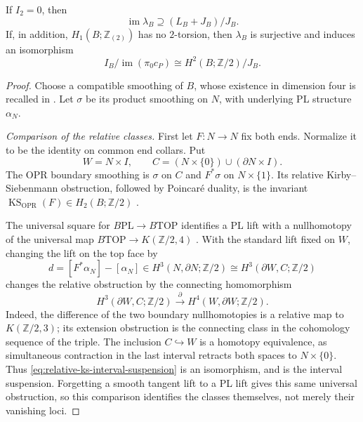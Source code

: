 \begin{theorem}\label{thm:four-dimensional-obstruction-realization}
If $I_2=0$, then
\begin{equation}\label{eq:four-dimensional-obstruction-range}
       \operatorname{im}\lambda_B\supseteq(L_B+J_B)/J_B.
\end{equation}
If, in addition, $H_1(B;\mathbb Z_{(2)})$ has no $2$-torsion,
then $\lambda_B$ is surjective and induces an isomorphism
\begin{equation}\label{eq:four-dimensional-realized-quotient}
 I_B/\operatorname{im}(\pi_0c_P)
                 \cong H^2(B;\mathbb Z/2)/J_B.
\end{equation}
\end{theorem}

\begin{proof}
Choose a compatible smoothing of $B$, whose existence in dimension
four is recalled in \cite[Essay~I, p.~39]{KirbySiebenmann1977}.
Let $\sigma$ be its product smoothing on $N$, with underlying PL
structure $\alpha_N$.

\medskip\noindent\textit{Comparison of the relative classes.}
First let $F:N\to N$ fix both ends. Normalize it to be the identity
on common end collars. Put
\[
 W=N\times I,\qquad
 C=(N\times\{0\})\cup(\partial N\times I).
\]
The OPR boundary smoothing is $\sigma$ on $C$ and $F^*\sigma$ on
$N\times\{1\}$. Its relative Kirby--Siebenmann obstruction, followed
by Poincar\'e duality, is the invariant
$\operatorname{KS}_{\mathrm{OPR}}(F)\in H_2(B;\mathbb Z/2)$
\cite[pp.~2, 7--9]{OrsonPowellRandalWilliams2026}.

The universal square for $B\mathrm{PL}\to B\mathrm{TOP}$ identifies
a PL lift with a nullhomotopy of the universal map
$B\mathrm{TOP}\to K(\mathbb Z/2,4)$
\cite[Essay~V, Section~5.6, pp.~252--253]{KirbySiebenmann1977}.
With the standard lift fixed on $W$, changing the lift on the top
face by
\[
 d=[F^*\alpha_N]-[\alpha_N]
       \in H^3(N,\partial N;\mathbb Z/2)
       \cong H^3(\partial W,C;\mathbb Z/2)
\]
changes the relative obstruction by the connecting homomorphism
\begin{equation}\label{eq:relative-ks-interval-suspension}
 H^3(\partial W,C;\mathbb Z/2)
       \xrightarrow{\ \partial\ }
 H^4(W,\partial W;\mathbb Z/2).
\end{equation}
Indeed, the difference of the two boundary nullhomotopies is a
relative map to $K(\mathbb Z/2,3)$; its extension obstruction is
the connecting class in the cohomology sequence of the triple.
The inclusion $C\hookrightarrow W$ is a homotopy equivalence,
as simultaneous contraction in the last interval retracts both
spaces to $N\times\{0\}$. Thus
\eqref{eq:relative-ks-interval-suspension} is an isomorphism,
and is the interval suspension. Forgetting a smooth tangent lift
to a PL lift gives this same universal obstruction, so this
comparison identifies the classes themselves, not merely their
vanishing loci.


\end{proof}
